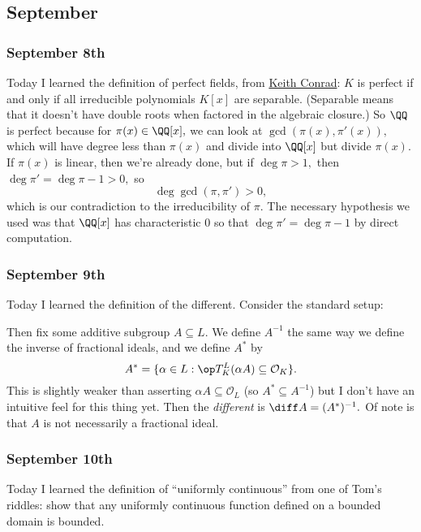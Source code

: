 \subsection{September}

\subsubsection{September 8th}
Today I learned the definition of perfect fields, from \href{https://kconrad.math.uconn.edu/blurbs/galoistheory/perfect.pdf}{Keith Conrad}: $K$ is perfect if and only if all irreducible polynomials $K[x]$ are separable. (Separable means that it doesn't have double roots when factored in the algebraic closure.) So $\QQ$ is perfect because for $\pi(x)\in\QQ[x],$ we can look at $\gcd(\pi(x),\pi'(x)),$ which will have degree less than $\pi(x)$ and divide into $\QQ[x]$ but divide $\pi(x).$ If $\pi(x)$ is linear, then we're already done, but if $\deg\pi>1,$ then $\deg\pi'=\deg\pi-1>0,$ so
\[\deg\gcd(\pi,\pi')>0,\]
which is our contradiction to the irreducibility of $\pi.$ The necessary hypothesis we used was that $\QQ[x]$ has characteristic $0$ so that $\deg\pi'=\deg\pi-1$ by direct computation.

\subsubsection{September 9th}
Today I learned the definition of the different. Consider the standard setup:
\begin{center}
\end{center}
Then fix some additive subgroup $A\subseteq L.$ We define $A^{-1}$ the same way we define the inverse of fractional ideals, and we define $A^*$ by
\[A^*=\{\alpha\in L:\op T_K^L(\alpha A)\subseteq\mathcal O_K\}.\]
This is slightly weaker than asserting $\alpha A\subseteq\mathcal O_L$ (so $A^*\subseteq A^{-1}$) but I don't have an intuitive feel for this thing yet. Then the \textit{different} is $\diff A=(A^*)^{-1}.$ Of note is that $A$ is not necessarily a fractional ideal.

\subsubsection{September 10th}
Today I learned the definition of ``uniformly continuous'' from one of Tom's riddles: show that any uniformly continuous function defined on a bounded domain is bounded.


